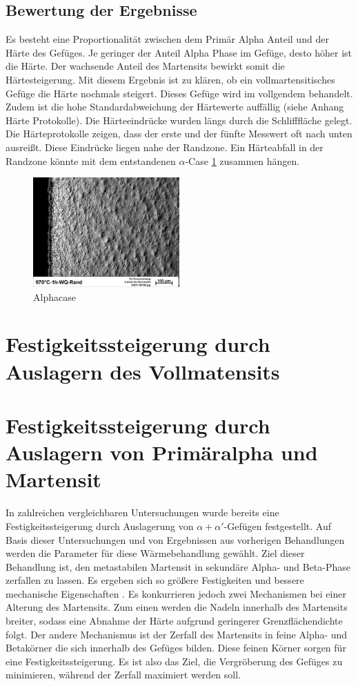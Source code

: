 \documentclass[a4paper, 11pt]{tubsreprt}
\begin{document}
\subsection{Bewertung der Ergebnisse}
Es besteht eine Proportionalität zwischen dem Primär Alpha Anteil und der Härte des Gefüges. Je geringer der Anteil Alpha Phase im Gefüge, desto höher ist die Härte. Der wachsende Anteil des Martensits bewirkt somit die Härtesteigerung. Mit diesem Ergebnis ist zu klären, ob ein vollmartensitisches Gefüge die Härte nochmals steigert. Dieses Gefüge wird im vollgendem behandelt.
Zudem ist die hohe Standardabweichung der Härtewerte auffällig (siehe Anhang Härte Protokolle). Die Härteeindrücke wurden längs durch die Schlifffläche gelegt. Die Härteprotokolle zeigen, dass der erste und der fünfte Messwert oft nach unten ausreißt. Diese Eindrücke liegen nahe der Randzone. Ein Härteabfall in der Randzone könnte mit dem entstandenen $\alpha$-Case \ref{alphacase} zusammen hängen.   

\begin{figure}
\centering
\includegraphics[width=0.5\textwidth]{Bilder/alphacase.jpg}
\caption{Alphacase}
\label{alphacase}
\end{figure}  




\section{Festigkeitssteigerung durch Auslagern des Vollmatensits}
\section{Festigkeitssteigerung durch Auslagern von Primäralpha und Martensit}\label{Primäralpha und martensit}
In zahlreichen vergleichbaren Untersuchungen wurde bereits eine Festigkeitssteigerung durch Auslagerung von $\alpha + \alpha'$-Gefügen festgestellt. Auf Basis dieser Untersuchungen und von Ergebnissen aus vorherigen Behandlungen werden die Parameter für diese Wärmebehandlung gewählt. Ziel dieser Behandlung ist, den metastabilen Martensit in sekundäre Alpha- und Beta-Phase zerfallen zu lassen. Es ergeben sich so größere Festigkeiten und bessere mechanische Eigenschaften \cite{Gilbert2004}. Es konkurrieren jedoch zwei Mechanismen bei einer Alterung des Martensits. Zum einen werden die Nadeln innerhalb des Martensits breiter, sodass eine Abnahme der Härte aufgrund geringerer Grenzflächendichte folgt. Der andere Mechanismus ist der Zerfall des Martensits in feine Alpha- und Betakörner die sich innerhalb des Gefüges bilden. Diese feinen Körner sorgen für eine Festigkeitssteigerung. Es ist also das Ziel, die Vergröberung des Gefüges zu minimieren, während der Zerfall maximiert werden soll. 
\end{document}
